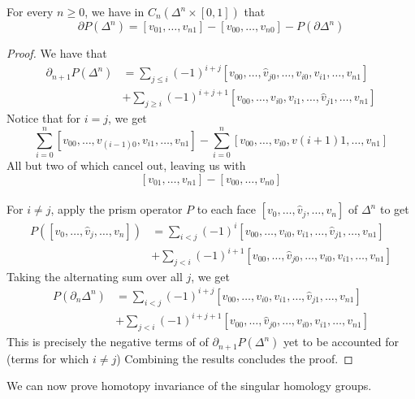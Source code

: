 \documentclass[a4paper]{article}
\begin{document}
\begin{lmm}{}{} For every $n\geq 0$, we have in $C_n(\Delta^n\times[0,1])$ that $$\partial P(\Delta^n)=[v_{01},\dots,v_{n1}]-[v_{00},\dots,v_{n0}]-P(\partial\Delta^n)$$ \tcbline
\begin{proof} We have that
\begin{align*}
\partial_{n+1}P(\Delta^n)&=\sum_{j\leq i}(-1)^{i+j}[v_{00},\dots,\hat{v}_{j0},\dots,v_{i0},v_{i1},\dots,v_{n1}]\\
&+\sum_{j\geq i}(-1)^{i+j+1}[v_{00},\dots,v_{i0},v_{i1},\dots,\hat{v}_{j1},\dots,v_{n1}]
\end{align*}
Notice that for $i=j$, we get $$\sum_{i=0}^n[v_{00},\dots,v_{(i-1)0},v_{i1},\dots,v_{n1}]-\sum_{i=0}^n[v_{00},\dots,v_{i0},v{(i+1)1},\dots,v_{n1}]$$
All but two of which cancel out, leaving us with $$[v_{01},\dots,v_{n1}]-[v_{00},\dots,v_{n0}]$$~\\
For $i\neq j$, apply the prism operator $P$ to each face $[v_0,\dots,\hat{v}_j,\dots,v_n]$ of $\Delta^n$ to get 
\begin{align*}
P([v_0,\dots,\hat{v}_j,\dots,v_n])&=\sum_{i<j}(-1)^i[v_{00},\dots,v_{i0},v_{i1},\dots,\hat{v}_{j1},\dots,v_{n1}]\\
&+\sum_{j<i}(-1)^{i+1}[v_{00},\dots,\hat{v}_{j0},\dots,v_{i0},v_{i1},\dots,v_{n1}]
\end{align*}
Taking the alternating sum over all $j$, we get 
\begin{align*}
P(\partial_n\Delta^n)&=\sum_{i<j}(-1)^{i+j}[v_{00},\dots,v_{i0},v_{i1},\dots,\hat{v}_{j1},\dots,v_{n1}]\\
&+\sum_{j<i}(-1)^{i+j+1}[v_{00},\dots,\hat{v}_{j0},\dots,v_{i0},v_{i1},\dots,v_{n1}]
\end{align*}
This is precisely the negative terms of of $\partial_{n+1}P(\Delta^n)$ yet to be accounted for (terms for which $i\neq j$) Combining the results concludes the proof. 
\end{proof}
\end{lmm}

We can now prove homotopy invariance of the singular homology groups. 
\end{document}
